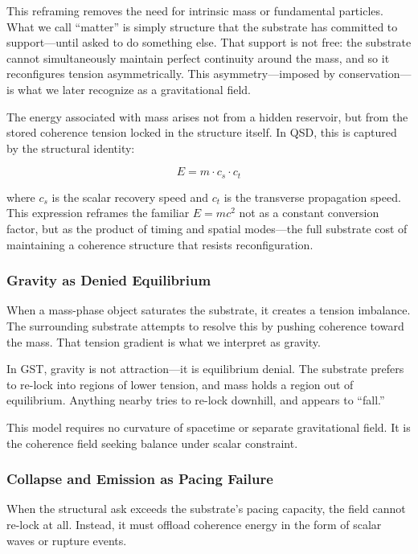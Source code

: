 \documentclass[entropy,article,submit,pdftex,moreauthors]{Definitions/mdpi}
\begin{document}
This reframing removes the need for intrinsic mass or fundamental particles. What we call “matter” is simply structure that the substrate has committed to support—until asked to do something else. That support is not free: the substrate cannot simultaneously maintain perfect continuity around the mass, and so it reconfigures tension asymmetrically. This asymmetry—imposed by conservation—is what we later recognize as a gravitational field.

The energy associated with mass arises not from a hidden reservoir, but from the stored coherence tension locked in the structure itself. In QSD, this is captured by the structural identity:

\[
E = m \cdot c_s \cdot c_t
\]

where \( c_s \) is the scalar recovery speed and \( c_t \) is the transverse propagation speed. This expression reframes the familiar \( E = mc^2 \) not as a constant conversion factor, but as the product of timing and spatial modes—the full substrate cost of maintaining a coherence structure that resists reconfiguration.



\subsubsection{Gravity as Denied Equilibrium}

When a mass-phase object saturates the substrate, it creates a tension imbalance. The surrounding substrate attempts to resolve this by pushing coherence toward the mass. That tension gradient is what we interpret as gravity.

In GST, gravity is not attraction—it is equilibrium denial. The substrate prefers to re-lock into regions of lower tension, and mass holds a region out of equilibrium. Anything nearby tries to re-lock downhill, and appears to “fall.”

This model requires no curvature of spacetime or separate gravitational field. It is the coherence field seeking balance under scalar constraint.

\subsubsection{Collapse and Emission as Pacing Failure}

When the structural ask exceeds the substrate’s pacing capacity, the field cannot re-lock at all. Instead, it must offload coherence energy in the form of scalar waves or rupture events.
\end{document}
